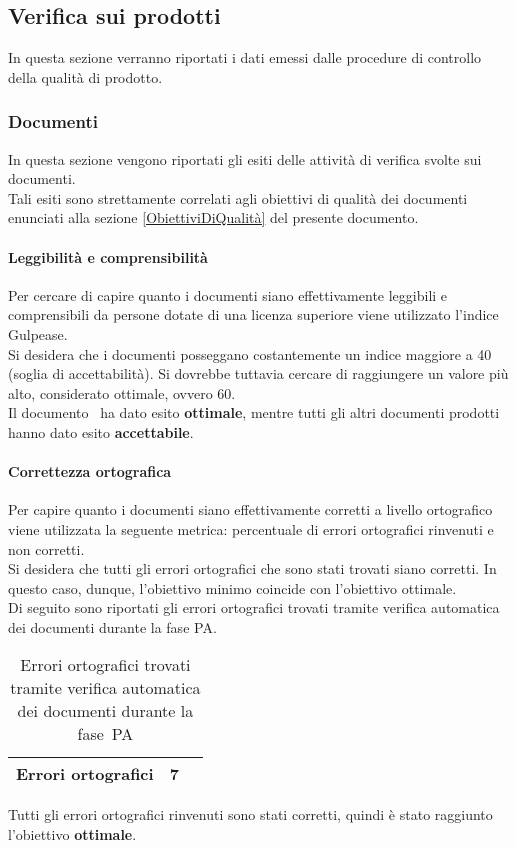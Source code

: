 \documentclass[../PianoDiQualifica.tex]{subfiles}
\begin{document}
\begin{appendices}
			
	\subsection{Verifica sui prodotti}
	In questa sezione verranno riportati i dati emessi dalle procedure di controllo della qualità di prodotto\g.
		\subsubsection{Documenti}
		In questa sezione vengono riportati gli esiti delle attività di verifica svolte sui documenti.\\
		Tali esiti sono strettamente correlati agli obiettivi di qualità dei documenti enunciati alla sezione \ref{ObiettiviDiQualità} del presente documento.
			
			\paragraph{Leggibilità e comprensibilità}
			Per cercare di capire quanto i documenti siano effettivamente leggibili e comprensibili da persone dotate di una licenza superiore viene utilizzato l’indice Gulpease\g.\\
			Si desidera che i documenti posseggano costantemente un indice maggiore a 40 (soglia di accettabilità). Si dovrebbe tuttavia cercare di raggiungere un valore più alto, considerato ottimale, ovvero 60.\\
			Il documento \glossariov\ ha dato esito \textbf{ottimale}, mentre tutti gli altri documenti prodotti hanno dato esito \textbf{accettabile}.
			
			\paragraph{Correttezza ortografica}
			Per capire quanto i documenti siano effettivamente corretti a livello ortografico viene utilizzata la seguente metrica: percentuale di errori ortografici rinvenuti e non corretti.\\
			Si desidera che tutti gli errori ortografici che sono stati trovati siano corretti. In questo caso, dunque, l'obiettivo minimo coincide con l'obiettivo ottimale.\\
			Di seguito sono riportati gli errori ortografici trovati tramite verifica automatica dei documenti durante la fase PA.
			\begin{table}[H]
				\centering
				\begin{tabular}{l * {2}{c}}
					\midrule
					Errori ortografici & 7 \\
					\midrule
				\end{tabular}
				\caption{Errori ortografici trovati tramite verifica automatica dei documenti durante la fase\g\ PA}
				\label{tab:errori_automatica}
			\end{table}
			Tutti gli errori ortografici rinvenuti sono stati corretti, quindi è stato raggiunto l'obiettivo \textbf{ottimale}.
			

\end{appendices}
\end{document}
